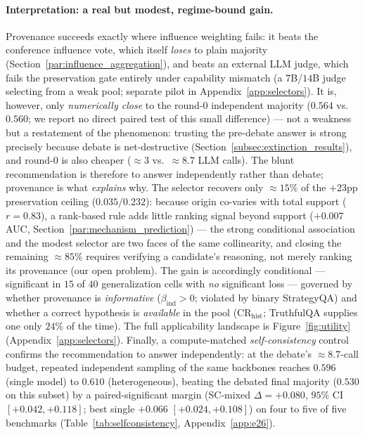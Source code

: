 \paragraph{Interpretation: a real but modest, regime-bound gain.}
\label{par:selector_comparison}
Provenance succeeds exactly where influence weighting fails: it beats the conference influence vote, which
itself \emph{loses} to plain majority (Section~\ref{par:influence_aggregation}), and beats an external LLM
judge, which fails the preservation gate entirely under capability mismatch (a $7$B/$14$B judge selecting
from a weak pool; separate pilot in Appendix~\ref{app:selectors}). It is, however, only \emph{numerically
close} to the round-$0$ independent majority ($0.564$ vs.\ $0.560$; we report no direct paired test of this
small difference) --- not a weakness but a restatement of the phenomenon:
trusting the pre-debate answer is strong precisely because debate is net-destructive
(Section~\ref{subsec:extinction_results}), and round-$0$ is also cheaper ($\approx\!3$ vs.\ $\approx\!8.7$
LLM calls). The blunt recommendation is therefore to answer independently rather than debate; provenance is
what \emph{explains} why. The selector recovers only $\approx 15\%$ of the $+23$pp preservation ceiling
($0.035/0.232$): because origin co-varies with total support ($r=0.83$), a rank-based rule adds little
ranking signal beyond support ($+0.007$ AUC, Section~\ref{par:mechanism_prediction}) --- the strong
conditional association and the modest selector are two faces of the same collinearity, and closing the
remaining $\approx 85\%$ requires verifying a candidate's reasoning, not merely ranking its provenance (our
open problem). The gain is accordingly conditional --- significant in $15$ of $40$ generalization cells with
\emph{no} significant loss --- governed by whether provenance is \emph{informative}
($\beta_{\mathrm{ind}}>0$; violated by binary StrategyQA) and whether a correct hypothesis is
\emph{available} in the pool ($\mathrm{CR}_{\mathrm{hist}}$; TruthfulQA supplies one only $24\%$ of the time).
The full applicability landscape is Figure~\ref{fig:utility} (Appendix~\ref{app:selectors}). Finally, a
compute-matched \emph{self-consistency} control confirms the recommendation to answer independently: at the
debate's $\approx\!8.7$-call budget, repeated independent sampling of the same backbones reaches $0.596$
(single model) to $0.610$ (heterogeneous), beating the debated final majority ($0.530$ on this subset) by a
paired-significant margin (SC-mixed $\Delta=+0.080$, $95\%$ CI $[+0.042,+0.118]$; best single $+0.066$
$[+0.024,+0.108]$) on four to five of five benchmarks (Table~\ref{tab:selfconsistency}, Appendix~\ref{app:e26}).


